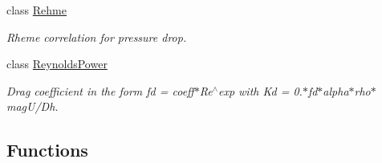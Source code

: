 \begin{DoxyCompactItemize}
class \hyperlink{classFoam_1_1FSDragCoefficientModels_1_1Rehme}{Rehme}
\begin{DoxyCompactList}\small\item\em Rheme correlation for pressure drop. \end{DoxyCompactList}\item 
class \hyperlink{classFoam_1_1FSDragCoefficientModels_1_1ReynoldsPower}{Reynolds\+Power}
\begin{DoxyCompactList}\small\item\em Drag coefficient in the form fd = coeff$\ast$\+Re$^\wedge$exp with Kd = 0.$\ast$fd$\ast$alpha$\ast$rho$\ast$mag\+U/\+Dh. \end{DoxyCompactList}\end{DoxyCompactItemize}
\subsection*{Functions}
